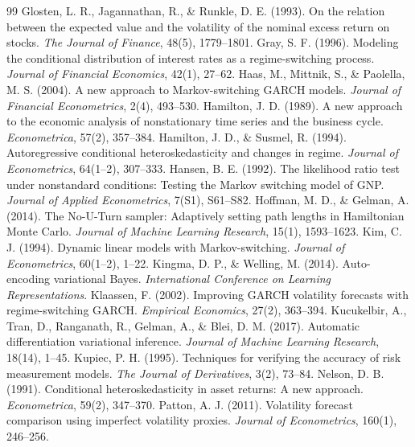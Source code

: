 \documentclass[12pt,a4paper]{article}
\numberwithin{equation}{section}
\theoremstyle{definition}
\begin{document}
\begin{thebibliography}{99}
		 Glosten, L. R., Jagannathan, R., \& Runkle, D. E. (1993). On the relation between the expected value and the volatility of the nominal excess return on stocks. \emph{The Journal of Finance}, 48(5), 1779--1801.
		 Gray, S. F. (1996). Modeling the conditional distribution of interest rates as a regime-switching process. \emph{Journal of Financial Economics}, 42(1), 27--62.
		 Haas, M., Mittnik, S., \& Paolella, M. S. (2004). A new approach to Markov-switching GARCH models. \emph{Journal of Financial Econometrics}, 2(4), 493--530.
		 Hamilton, J. D. (1989). A new approach to the economic analysis of nonstationary time series and the business cycle. \emph{Econometrica}, 57(2), 357--384.
		 Hamilton, J. D., \& Susmel, R. (1994). Autoregressive conditional heteroskedasticity and changes in regime. \emph{Journal of Econometrics}, 64(1--2), 307--333.
		 Hansen, B. E. (1992). The likelihood ratio test under nonstandard conditions: Testing the Markov switching model of GNP. \emph{Journal of Applied Econometrics}, 7(S1), S61--S82.
		 Hoffman, M. D., \& Gelman, A. (2014). The No-U-Turn sampler: Adaptively setting path lengths in Hamiltonian Monte Carlo. \emph{Journal of Machine Learning Research}, 15(1), 1593--1623.
		 Kim, C. J. (1994). Dynamic linear models with Markov-switching. \emph{Journal of Econometrics}, 60(1--2), 1--22.
		 Kingma, D. P., \& Welling, M. (2014). Auto-encoding variational Bayes. \emph{International Conference on Learning Representations}.
		 Klaassen, F. (2002). Improving GARCH volatility forecasts with regime-switching GARCH. \emph{Empirical Economics}, 27(2), 363--394.
		 Kucukelbir, A., Tran, D., Ranganath, R., Gelman, A., \& Blei, D. M. (2017). Automatic differentiation variational inference. \emph{Journal of Machine Learning Research}, 18(14), 1--45.
		 Kupiec, P. H. (1995). Techniques for verifying the accuracy of risk measurement models. \emph{The Journal of Derivatives}, 3(2), 73--84.
		 Nelson, D. B. (1991). Conditional heteroskedasticity in asset returns: A new approach. \emph{Econometrica}, 59(2), 347--370.
		 Patton, A. J. (2011). Volatility forecast comparison using imperfect volatility proxies. \emph{Journal of Econometrics}, 160(1), 246--256.
	\end{thebibliography}
	
\end{document}
